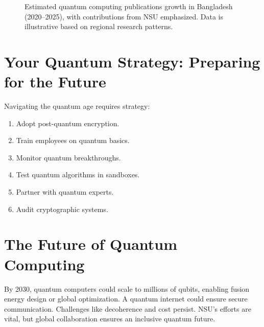 \documentclass[a4paper,10pt,twocolumn]{memoir}
\begin{document}
\begin{figure}[h]
\centering
{}
\caption{Estimated quantum computing publications growth in Bangladesh (2020–2025), with contributions from NSU emphasized. Data is illustrative based on regional research patterns.}
\label{fig:quantumgrowth}
\end{figure}


\section*{Your Quantum Strategy: Preparing for the Future}
Navigating the quantum age requires strategy:
\begin{enumerate}
    \item Adopt post-quantum encryption.
    \item Train employees on quantum basics.
    \item Monitor quantum breakthroughs.
    \item Test quantum algorithms in sandboxes.
    \item Partner with quantum experts.
    \item Audit cryptographic systems.
\end{enumerate}


\section*{The Future of Quantum Computing}
By 2030, quantum computers could scale to millions of qubits, enabling fusion energy design or global optimization. A quantum internet could ensure secure communication. Challenges like decoherence and cost persist. NSU's efforts are vital, but global collaboration ensures an inclusive quantum future.
\clearpage
\end{document}
